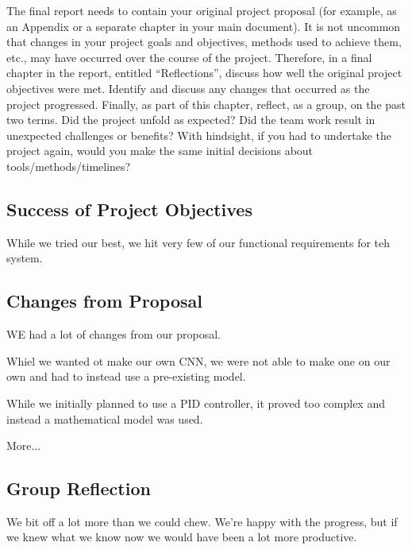 \documentclass[titlepage]{article}
\begin{document}
The final report needs to contain your original project proposal
(for example, as an Appendix or a separate chapter in your main
document). It is not uncommon that changes in your project goals
and objectives, methods used to achieve them, etc., may have
occurred over the course of the project. Therefore, in a final
chapter in the report, entitled “Reflections”, discuss how well
the original project objectives were met. Identify and discuss any
changes that occurred as the project progressed. Finally, as part
of this chapter, reflect, as a group, on the past two terms. Did
the project unfold as expected? Did the team work result in unexpected
challenges or benefits? With hindsight, if you had to undertake the
project again, would you make the same initial decisions about
tools/methods/timelines?

\subsection{Success of Project Objectives}

While we tried our best, we hit very few of our functional requirements for teh system.

\subsection{Changes from Proposal}

WE had a lot of changes from our proposal.

Whiel we wanted ot make our own CNN, we were not able to make one on our own and had to instead use a pre-existing model.

While we initially planned to use a PID controller, it proved too complex and instead a mathematical model was used.

More...

\subsection{Group Reflection}

We bit off a lot more than we could chew. We're happy with the progress, but if we knew what we know now we would have been a lot more productive.

\begin{thebibliography}{00}
\end{thebibliography}
\vspace{12pt}
\color{red}

\appendix
\end{document}
